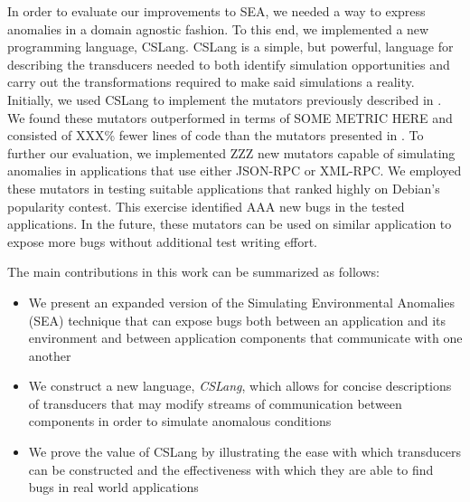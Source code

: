 In order to evaluate our improvements to SEA, we needed a way to express
anomalies in a domain agnostic fashion.  To this end, we
implemented a new programming language, CSLang.  CSLang is a simple, but
powerful, language for describing the transducers needed to both identify
simulation opportunities and carry out the transformations required to make
said simulations a reality.  Initially, we used CSLang to implement the
mutators previously described in . We found these mutators outperformed in terms of SOME METRIC HERE and
consisted of XXX\% fewer lines of code than the mutators presented in
.
To further our evaluation, we implemented ZZZ new
mutators capable of simulating anomalies in applications that use either
JSON-RPC or XML-RPC.  We employed these mutators in testing suitable
applications that ranked highly on Debian's popularity contest.  This
exercise identified AAA new bugs in the tested applications.  In the
future, these mutators can be used on similar application to expose more
bugs without additional test writing effort.


The main contributions in this work can be summarized as follows:

\begin{itemize}

\item{We present an expanded version of the Simulating Environmental
  Anomalies (SEA) technique that can expose bugs both between an
    application and its environment and between application components that
    communicate with one another}

\item{We construct a new language, {\em CSLang},
which allows for concise descriptions of transducers that may
modify streams of communication between components in order to simulate
anomalous conditions}

\item{We prove the value of CSLang by illustrating the ease with which
  transducers can be constructed and the effectiveness with which they are
    able to find bugs in real world applications }

\end{itemize}
